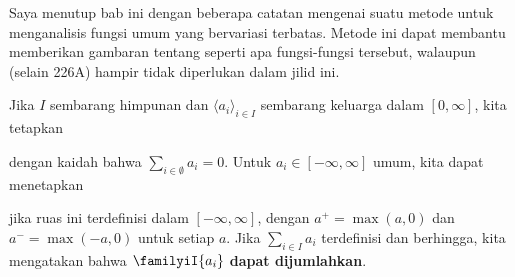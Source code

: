 
\def\chaptername{Teorema Dasar Kalkulus}
\def\sectionname{Dekomposisi Lebesgue suatu fungsi bervariasi
terbatas}


Saya menutup bab ini dengan beberapa catatan mengenai suatu metode untuk
menganalisis fungsi umum yang bervariasi terbatas. Metode ini dapat membantu
memberikan gambaran tentang seperti apa fungsi-fungsi tersebut, walaupun
(selain 226A) hampir tidak diperlukan dalam jilid ini.

  Jika $I$ sembarang himpunan dan
$\langle a_i\rangle_{i\in I}$ sembarang keluarga dalam $[0,\infty]$, kita
tetapkan


\noindent dengan kaidah bahwa $\sum_{i\in\emptyset}a_i=0$.
 Untuk $a_i\in[-\infty,\infty]$ umum, kita
dapat menetapkan


\noindent jika ruas ini terdefinisi dalam $[-\infty,\infty]$, dengan $a^+=\max(a,0)$ dan
$a^-=\max(-a,0)$ untuk setiap $a$. Jika $\sum_{i\in I}a_i$ terdefinisi
dan berhingga, kita mengatakan bahwa $\familyiI{a_i}$ {\bf dapat
dijumlahkan}.

